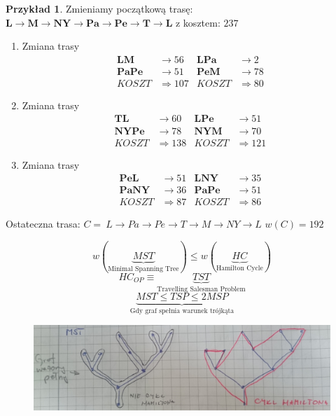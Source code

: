 \documentclass[a4paper,12pt]{article}
\theoremstyle{definition}%
\newtheorem{example}{Przykład}
\newtheorem*{example*}{Przykład} %
\theoremstyle{definition}
\theoremstyle{problem}
\begin{document}
\begin{example*}
Zmieniamy początkową trasę: $\textbf{L}\rightarrow \textbf{M}\rightarrow \textbf{NY}\rightarrow \textbf{Pa}\rightarrow \textbf{Pe}\rightarrow \textbf{T} \rightarrow \textbf{L}$ z kosztem: $237$
\begin{enumerate}
\item Zmiana trasy
\begin{align*}
\textbf{LM}&\rightarrow 56 & \textbf{LPa}&\rightarrow 2\\
\textbf{PaPe}&\rightarrow 51 & \textbf{PeM}&\rightarrow 78\\
KOSZT &\Rightarrow 107 & KOSZT &\Rightarrow 80
\end{align*}
\item Zmiana trasy
\begin{align*}
\textbf{TL}&\rightarrow 60 & \textbf{LPe}&\rightarrow 51\\
\textbf{NYPe}&\rightarrow 78 & \textbf{NYM}&\rightarrow 70\\
KOSZT &\Rightarrow 138 & KOSZT &\Rightarrow 121
\end{align*}
\item Zmiana trasy
\begin{align*}
\textbf{PeL}&\rightarrow 51 & \textbf{LNY}&\rightarrow 35\\
\textbf{PaNY}&\rightarrow 36 & \textbf{PaPe}&\rightarrow 51\\
KOSZT &\Rightarrow 87 & KOSZT &\Rightarrow 86
\end{align*}
\end{enumerate}
Ostateczna trasa: $C=\ L\rightarrow Pa\rightarrow Pe\rightarrow T\rightarrow M\rightarrow NY\rightarrow L$ $w(C)=192$
\end{example*}

$$w(\underbrace{MST}_{\text{Minimal Spanning Tree}})\leq w(\underbrace{HC}_{\text{Hamilton Cycle}})$$
$$HC_{OP} \equiv \underbrace{TST}_{\text{Travelling Salesman Problem}}$$
$$\underbrace{MST \leq TSP \leq 2 MSP}_{\text{Gdy graf spełnia warunek trójkąta}}$$

\begin{figure}[H]
\centering
\includegraphics[width=.9\textwidth]{img/g8}
\end{figure}

\end{document}
